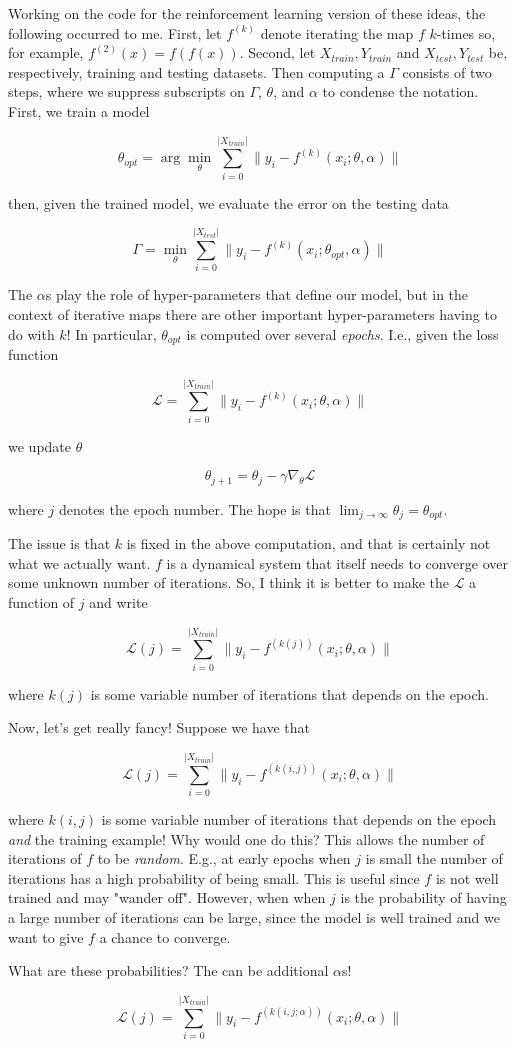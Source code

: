 \documentclass{article}
\begin{document}
Working on the code for the reinforcement learning version of these ideas, the following occurred to me.  First, let $f^{(k)}$ denote iterating the map $f$ $k$-times so, for example, $f^{(2)}(x) = f(f(x))$.  Second, let $X_{train},Y_{train}$ and $X_{test},Y_{test}$ be, respectively, training and testing datasets.  Then
computing a $\Gamma$ consists of two steps, where we suppress subscripts on $\Gamma$, $\theta$, and $\alpha$ to condense the notation.  First, we train a model

$$
\theta_{opt} = \arg \min_\theta \sum_{i=0}^{|X_{train}|} \|y_i - f^{(k)}(x_i;\theta,\alpha)\| 
$$

\noindent then, given the trained model, we evaluate the error on the testing data 

$$
\Gamma = \min_\theta \sum_{i=0}^{|X_{test}|} \|y_i - f^{(k)}(x_i;\theta_{opt},\alpha)\| 
$$

The $\alpha$s play the role of hyper-parameters that define our model, but in the context of iterative maps there are other important hyper-parameters having to do with $k$!  In particular, $\theta_{opt}$ is computed over several \emph{epochs}.  I.e., given the loss function

$$
\mathcal{L} = \sum_{i=0}^{|X_{train}|} \|y_i - f^{(k)}(x_i;\theta,\alpha)\|
$$

we update $\theta$

$$
\theta_{j+1} = \theta_j  - \gamma \nabla_\theta \mathcal{L} 
$$

where $j$ denotes the epoch number.  The hope is that $\lim_{j\to\infty} \theta_j = \theta_{opt}$.

The issue is that $k$ is fixed in the above computation, and that is certainly not what we actually want. 
$f$ is a dynamical system that itself needs to converge over some unknown number of iterations.  So, I think it is better to make the $\mathcal{L}$ 
a function of $j$ and write

$$
\mathcal{L}(j) = \sum_{i=0}^{|X_{train}|} \|y_i - f^{(k(j))}(x_i;\theta,\alpha)\|
$$

where $k(j)$ is some variable number of iterations that depends on the epoch.

Now, let's get really fancy!  Suppose we have that 

$$
\mathcal{L}(j) = \sum_{i=0}^{|X_{train}|} \|y_i - f^{(k(i,j))}(x_i;\theta,\alpha)\|
$$

where $k(i,j)$ is some variable number of iterations that depends on the epoch \emph{and} the training example!  Why would one do this?  This allows the number of iterations of $f$ to be \emph{random}.  E.g., at early epochs when $j$ is small the number of iterations has a high probability of being small.  This is useful  since $f$ is not well trained and may "wander off".  However, when when $j$ is the probability of having a large number of iterations can be large, since  the model is well trained and we want to give $f$ a chance to converge.

What are these probabilities?  The can be additional $\alpha$s!

$$
\mathcal{L}(j) = \sum_{i=0}^{|X_{train}|} \|y_i - f^{(k(i,j;\alpha))}(x_i;\theta,\alpha)\|
$$
\end{document}

